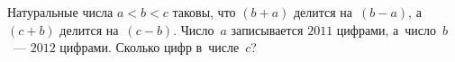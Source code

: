 \begin{problems}


\item
Натуральные числа $a < b < c$ таковы, что $(b + a)$ делится на~$(b - a)$,
а~$(c + b)$ делится на~$(c - b)$.
Число~$a$ записывается $2011$ цифрами, а~число~$b$~--- $2012$ цифрами.
Сколько цифр в~числе~$c$?



\end{problems}


